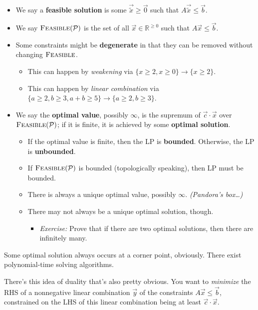 \begin{itemize}
    \item We say a \textbf{feasible solution} is some $\vec{\tilde{x}} \geq \vec{0}$ such that $A\vec{\tilde{x}} \leq \vec{b}$.
    \item We say $\textsc{Feasible}(\mathcal{P})$ is the set of all $\vec{x} \in \mathbb{R}^{\geq 0}$ such that $A\vec{x} \leq \vec{b}$.
    \item Some constraints might be \textbf{degenerate} in that they can be removed without changing $\textsc{Feasible}$.
    \begin{itemize}
        \item This can happen by \emph{weakening} via $\{x \geq 2, x \geq 0\} \to \{x \geq 2\}$.
        \item This can happen by \emph{linear combination} via $\{a \geq 2, b \geq 3, a + b \geq 5\} \to \{a \geq 2, b \geq 3\}$.
    \end{itemize}
    \item We say the \textbf{optimal value}, possibly $\infty$, is the supremum of $\vec{c} \cdot \vec{x}$ over $\textsc{Feasible}(\mathcal{P})$; if it is finite, it is achieved by some \textbf{optimal solution}.
    \begin{itemize}
        \item If the optimal value is finite, then the LP is \textbf{bounded}.  Otherwise, the LP is \textbf{unbounded}.
        \item If $\textsc{Feasible}(\mathcal{P})$ is bounded (topologically speaking), then LP must be bounded.
        \item There is always a unique optimal value, possibly $\infty$.  \emph{(Pandora's box\dots)}
        \item There may not always be a unique optimal solution, though.
        \begin{itemize}
            \item \emph{Exercise:} Prove that if there are two optimal solutions, then there are infinitely many.
        \end{itemize}
    \end{itemize}
\end{itemize}
Some optimal solution always occurs at a corner point, obviously.  There exist polynomial-time solving algorithms.

There's this idea of duality that's also pretty obvious.  You want to \emph{minimize} the RHS of a nonnegative linear combination $\vec{y}$ of the constraints $A \vec{x} \leq \vec{b}$, constrained on the LHS of this linear combination being at least $\vec{c} \cdot \vec{x}$.

